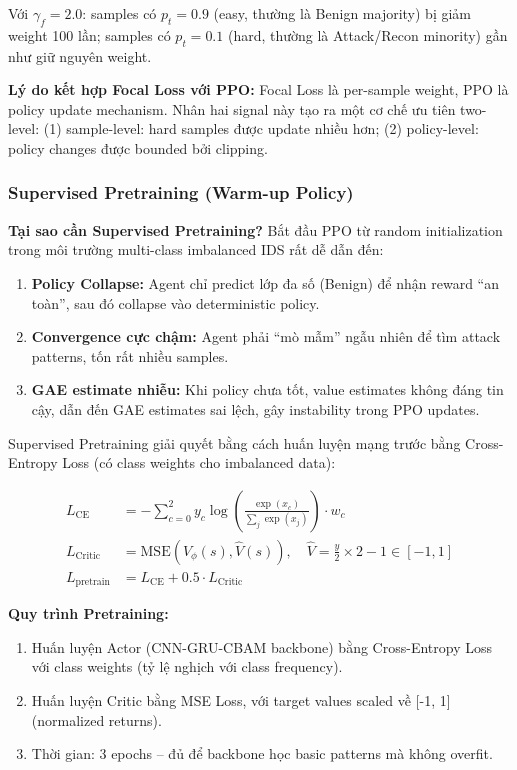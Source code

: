 \documentclass[12pt,a4paper]{article}
\begin{document}
Với $\gamma_f=2.0$: samples có $p_t=0.9$ (easy, thường là Benign majority) bị giảm weight 100 lần; samples có $p_t=0.1$ (hard, thường là Attack/Recon minority) gần như giữ nguyên weight.

\textbf{Lý do kết hợp Focal Loss với PPO:} Focal Loss là per-sample weight, PPO là policy update mechanism. Nhân hai signal này tạo ra một cơ chế ưu tiên two-level: (1) sample-level: hard samples được update nhiều hơn; (2) policy-level: policy changes được bounded bởi clipping.

\subsubsection{Supervised Pretraining (Warm-up Policy)}\label{sec:supervised_pretrain}

\textbf{Tại sao cần Supervised Pretraining?} Bắt đầu PPO từ random initialization trong môi trường multi-class imbalanced IDS rất dễ dẫn đến:
\begin{enumerate}
    \item \textbf{Policy Collapse:} Agent chỉ predict lớp đa số (Benign) để nhận reward ``an toàn'', sau đó collapse vào deterministic policy.
    \item \textbf{Convergence cực chậm:} Agent phải ``mò mẫm'' ngẫu nhiên để tìm attack patterns, tốn rất nhiều samples.
    \item \textbf{GAE estimate nhiễu:} Khi policy chưa tốt, value estimates không đáng tin cậy, dẫn đến GAE estimates sai lệch, gây instability trong PPO updates.
\end{enumerate}

Supervised Pretraining giải quyết bằng cách huấn luyện mạng trước bằng Cross-Entropy Loss (có class weights cho imbalanced data):

\begin{align}
    L_{\text{CE}} &= -\sum_{c=0}^{2} y_c \log\left(\frac{\exp(x_c)}{\sum_j \exp(x_j)}\right) \cdot w_c \label{eq:ce_loss} \\
    L_{\text{Critic}} &= \text{MSE}\left(V_\phi(s), \hat{V}(s)\right), \quad \hat{V} = \frac{y}{2} \times 2 - 1 \in [-1,1] \label{eq:critic_pretrain} \\
    L_{\text{pretrain}} &= L_{\text{CE}} + 0.5 \cdot L_{\text{Critic}} \label{eq:pretrain_total}
\end{align}

\textbf{Quy trình Pretraining:}
\begin{enumerate}
    \item Huấn luyện Actor (CNN-GRU-CBAM backbone) bằng Cross-Entropy Loss với class weights (tỷ lệ nghịch với class frequency).
    \item Huấn luyện Critic bằng MSE Loss, với target values scaled về [-1, 1] (normalized returns).
    \item Thời gian: 3 epochs -- đủ để backbone học basic patterns mà không overfit.
\end{enumerate}
\end{document}
